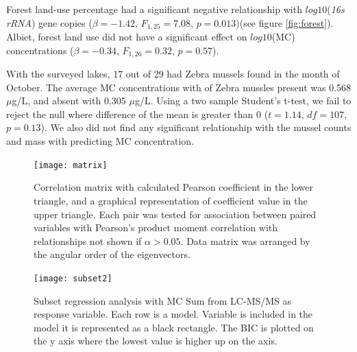 Forest land-use percentage had a significant negative relationship with $log10$(\emph{16s rRNA}) gene copies ($\beta=-1.42$, $F_{{1,25}}=7.08$, $p=0.013$)(see figure \ref{fig:forest}). Albiet, forest land use did not have a significant effect on $log10$(MC) concentrations ($\beta=-0.34$, $F_{{1,26}}=0.32$, $p=0.57$).

With the surveyed lakes, 17 out of 29 had Zebra mussels found in the month of October. The average MC concentrations with  of Zebra mussles present was 0.568 $\mu$g/L, and absent with 0.305 $\mu$g/L. Using a two sample Student's t-test, we fail to reject the null where difference of the mean is greater than 0 ($t=1.14$, $df=107$, $p=0.13$). We also did not find any significant relationship with the mussel counts and mass with predicting MC concentration.



\begin{figure}
	\texttt{[image: matrix]}
	\vspace*{-15mm}
	\caption{
  Correlation matrix with calculated Pearson coefficient in the lower triangle, and a graphical representation of coefficient value in the upper triangle. Each pair was tested for association between paired variables with Pearson's product moment correlation with relationships not shown if $\alpha>0.05$. Data matrix was arranged by the angular order of the eigenvectors.}
	\label{matrix}
\end{figure}


\begin{figure}[!ht]
	\texttt{[image: subset2]}
  	\vspace*{-15mm}
	\caption{Subset regression analysis with MC Sum from LC-MS/MS as response variable. Each row is a model. Variable is included in the model it is represented as a black rectangle. The BIC is plotted on the y axis where the lowest value is higher up on the axis.}
	\label{subset}
\end{figure}


